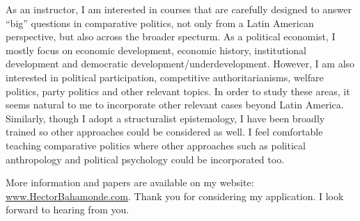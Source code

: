 \documentclass[10pt,stdletter,dateno,sigleft]{newlfm} %
\begin{document}
\begin{newlfm}
As an instructor, I am interested in courses that are carefully designed to answer ``big'' questions in comparative politics, not only from a Latin American perspective, but also across the broader specturm. As a political economist, I mostly focus on economic development, economic history, institutional development and democratic development/underdevelopment. However, I am also interested in political participation, competitive authoritarianisms, welfare politics, party politics and other relevant topics. In order to study these areas, it seems natural to me to incorporate other relevant cases beyond Latin America. Similarly, though I adopt a structuralist epistemology, I have been broadly trained so other approaches could be considered as well. I feel comfortable teaching comparative politics where other approaches such as political anthropology and political psychology could be incorporated too.


More information and papers are available on my website: \href{http://www.hectorbahamonde.com}{www.HectorBahamonde.com}. Thank you for considering my application. I look forward to hearing from you.






\end{newlfm}
\end{document}
